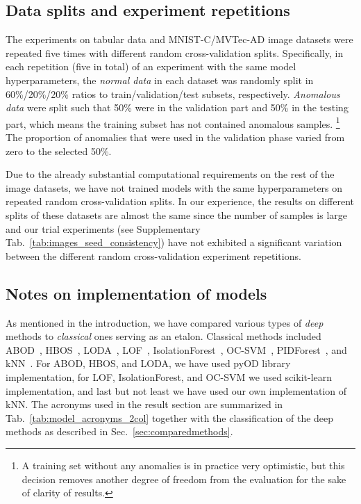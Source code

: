 \subsection{Data splits and experiment repetitions}
\label{sec:repetitions}
The experiments on tabular data and MNIST-C/MVTec-AD image datasets were repeated five times with different random cross-validation splits. Specifically, in each repetition (five in total) of an experiment with the same model hyperparameters, the \textit{normal data} in each dataset was randomly split in 60\%/20\%/20\% ratios to train/validation/test subsets, respectively. \textit{Anomalous data} were split such that 50\% were in the validation part and 50\% in the testing part, which means the training subset has not contained anomalous samples. \footnote{A training set without any anomalies is in practice very optimistic, but this decision removes another degree of freedom from the evaluation for the sake of clarity of results.} The proportion of anomalies that were used in the validation phase varied from zero to the selected 50\%. 

Due to the already substantial computational requirements on the rest of the image datasets, we have not trained models with the same hyperparameters on repeated random cross-validation splits. In our experience, the results on different splits of these datasets are almost the same since the number of samples is large and our trial experiments (see Supplementary Tab.~\ref{tab:images_seed_consistency}) have not exhibited a significant variation between the different random cross-validation experiment repetitions. 


\subsection{Notes on implementation of models}
As mentioned in the introduction, we have compared various types of \textit{deep} methods to \emph{classical} ones serving as an etalon. Classical methods included ABOD~\cite{kriegel2008angle}, HBOS~\cite{goldstein2012histogram}, LODA~\cite{pevny2016loda}, LOF~\cite{breunig2000lof}, IsolationForest~\cite{liu2008isolation}, OC-SVM~\cite{scholkopf2001estimating}, PIDForest~\cite{gopalanPIDForestAnomalyDetection2019}, and kNN~\cite{ramaswamy2000efficient}. For ABOD, HBOS, and LODA, we have used pyOD library~\cite{zhao2019pyod} implementation, for LOF, IsolationForest, and OC-SVM we used scikit-learn~\cite{scikit-learn} implementation, and last but not least we have used our own implementation of kNN. The acronyms used in the result section are summarized in Tab.~\ref{tab:model_acronyms_2col} together with the classification of the deep methods as described in Sec.~\ref{sec:comparedmethods}.


